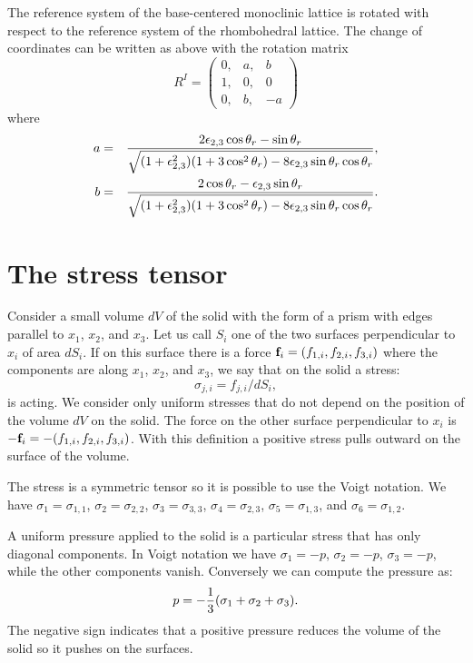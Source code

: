 \documentclass[12pt,a4paper]{article}
\begin{document}
The reference system of the base-centered monoclinic lattice is rotated 
with respect to the reference system of the rhombohedral lattice.
The change of coordinates can be written as above with the rotation matrix 
\begin{equation}
R^I=\left( \begin{array}{ccc}
0, & a, &  b\\
1, & 0, & 0  
\\
0, & b, & -a 
\end{array}
\right)
\end{equation}
where
\begin{eqnarray}
a&=& {2 \epsilon_{2,3} \cos \theta_r - \sin \theta_r \over 
\sqrt{(1+\epsilon_{2,3}^2)(1 + 3 \cos^2 \theta_r)-
8\epsilon_{2,3}\sin \theta_r\cos \theta_r}}, \\
b&=& {2 \cos \theta_r - \epsilon_{2,3} \sin \theta_r \over 
\sqrt{(1+\epsilon_{2,3}^2)(1 + 3 \cos^2 \theta_r)-
8\epsilon_{2,3}\sin \theta_r\cos \theta_r}}.
\end{eqnarray}

\newpage
\section{\color{coral}The stress tensor}

Consider a small volume $dV$ of the solid with the form of a prism with 
edges parallel to $x_1$, $x_2$, and $x_3$. Let us call $S_i$ one of
the two surfaces perpendicular to $x_i$ of area $dS_i$. If on this surface 
there is a force ${\bf f}_i=(f_{1,i}, f_{2,i}, f_{3,i})$ where the components
are along $x_1$, $x_2$, and $x_3$, we say that on the solid a
stress: 
\begin{equation}
\sigma_{j,i}=f_{j,i} / dS_i, 
\end{equation}
is acting.
We consider only uniform stresses
that do not depend on the position of the volume $dV$ on the solid.
The force on the other surface perpendicular to $x_i$ is 
$-{\bf f}_i=-(f_{1,i}, f_{2,i}, f_{3,i})$. With this definition a positive
stress pulls outward on the surface of the volume.

The stress is a symmetric tensor so it is possible to use the Voigt
notation. We have
$\sigma_1=\sigma_{1,1}$,
$\sigma_2=\sigma_{2,2}$, $\sigma_3=\sigma_{3,3}$, $\sigma_4=\sigma_{2,3}$,
$\sigma_5=\sigma_{1,3}$, and $\sigma_6=\sigma_{1,2}$.

A uniform pressure applied to the solid is a particular stress that has
only diagonal components. In Voigt notation we have
$\sigma_1=-p$, $\sigma_2=-p$, $\sigma_3=-p$, while the other components
vanish. Conversely we can compute the pressure as:
\begin{equation}
p=-{1\over 3} (\sigma_1 + \sigma_2 + \sigma_3).
\end{equation}
The negative sign indicates that a positive pressure reduces the
volume of the solid so it pushes on the surfaces.
\end{document}
